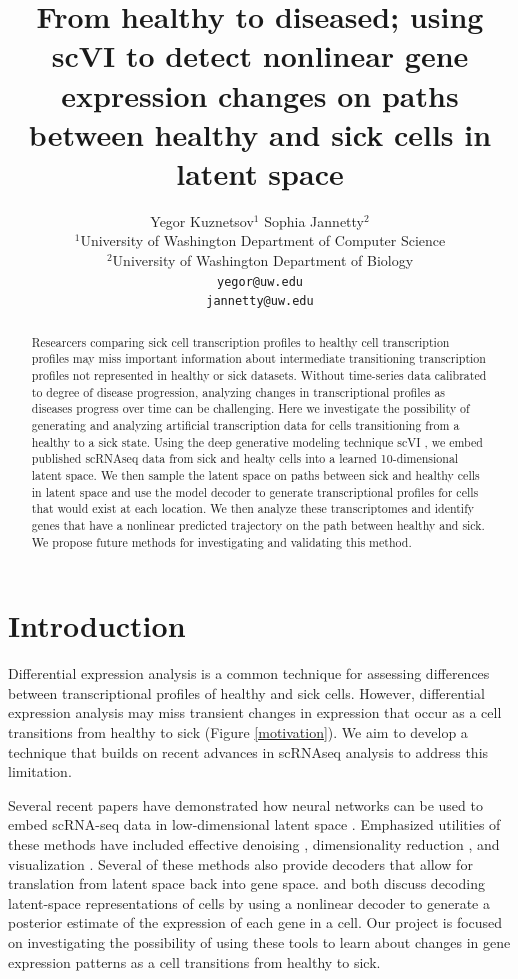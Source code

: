 \documentclass{article}
\title{From healthy to diseased; using scVI to detect nonlinear gene expression changes on paths between healthy and sick cells in latent space}
\author{%
Yegor Kuznetsov$^{1}$ \quad Sophia Jannetty$^{2}$\\
$^1$University of Washington Department of Computer Science\\
$^2$University of Washington Department of Biology\\
\texttt{yegor@uw.edu}\\
\texttt{jannetty@uw.edu}\\
}
\begin{document}
\maketitle


\begin{abstract}
  Researcers comparing sick cell transcription profiles to healthy cell transcription profiles may miss important information about intermediate transitioning transcription profiles not represented in healthy or sick datasets.
  Without time-series data calibrated to degree of disease progression, analyzing changes in transcriptional profiles as diseases progress over time can be challenging.
  Here we investigate the possibility of generating and analyzing artificial transcription data for cells transitioning from a healthy to a sick state.
  Using the deep generative modeling technique scVI \citep{lopez_deep_2018}, we embed published scRNAseq data from sick and healty cells into a learned 10-dimensional latent space.
  We then sample the latent space on paths between sick and healthy cells in latent space and use the model decoder to generate transcriptional profiles for cells that would exist at each location.
  We then analyze these transcriptomes and identify genes that have a nonlinear predicted trajectory on the path between healthy and sick.
  We propose future methods for investigating and validating this method.
\end{abstract}


\section{Introduction}

Differential expression analysis is a common technique for assessing differences between transcriptional profiles of healthy and sick cells\citep{anders_differential_2010}.
However, differential expression analysis may miss transient changes in expression that occur as a cell transitions from healthy to sick (Figure \ref*{motivation}).
We aim to develop a technique that builds on recent advances in scRNAseq analysis to address this limitation.

Several recent papers have demonstrated how neural networks can be used to embed scRNA-seq data in low-dimensional latent space \citep{ding_interpretable_2018,wang_vasc_2018,gronbech_scvae_2018,eraslan_single-cell_2019}.
Emphasized utilities of these methods have included effective denoising \citep{eraslan_single-cell_2019}, dimensionality reduction \citep{wang_vasc_2018,ding_interpretable_2018}, and visualization \citep{wang_vasc_2018}.
Several of these methods also provide decoders that allow for translation from latent space back into gene space.
\citet{gronbech_scvae_2018} and \citet{lopez_deep_2018} both discuss decoding latent-space representations of cells by using a nonlinear decoder to generate a posterior estimate of the expression of each gene in a cell.
Our project is focused on investigating the possibility of using these tools to learn about changes in gene expression patterns as a cell transitions from healthy to sick.
\end{document}
